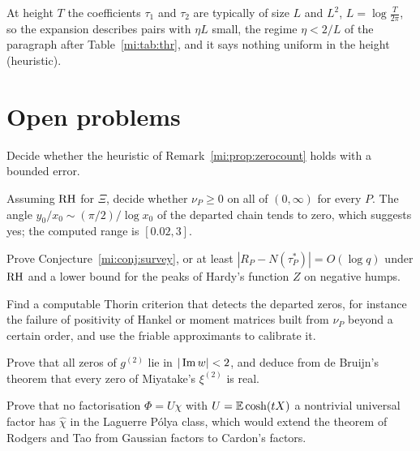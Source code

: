 At height $T$ the coefficients $\tau_1$ and $\tau_2$ are typically of size $L$ and $L^2$, $L=\log\frac T{2\pi}$, so the expansion describes pairs with $\eta L$ small, the regime $\eta<2/L$ of the paragraph after Table~\ref{mi:tab:thr}, and it says nothing uniform in the height (heuristic).

\section{Open problems}\label{mi:sec:open}

\begin{problem}
Decide whether the heuristic of Remark~\ref{mi:prop:zerocount} holds with a bounded error.
\end{problem}

\begin{problem}\label{mi:prob:nuP}
Assuming $\mathrm{RH}$ for $\Xi$, decide whether $\nu_P\ge0$ on all of $(0,\infty)$ for every $P$. The angle $y_0/x_0\sim(\pi/2)/\log x_0$ of the departed chain tends to zero, which suggests yes; the computed range is $[0.02,3]$.
\end{problem}

\begin{problem}
Prove Conjecture~\ref{mi:conj:survey}, or at least $|R_P-N(\tau_P^*)|=O(\log q)$ under $\mathrm{RH}$ and a lower bound for the peaks of Hardy's function $Z$ on negative humps.
\end{problem}

\begin{problem}
Find a computable Thorin criterion that detects the departed zeros, for instance the failure of positivity of Hankel or moment matrices built from $\nu_P$ beyond a certain order, and use the friable approximants to calibrate it.
\end{problem}

\begin{problem}
Prove that all zeros of $g^{(2)}$ lie in $|\operatorname{Im} w|<2$, and deduce from de Bruijn's theorem that every zero of Miyatake's $\xi^{(2)}$ is real.
\end{problem}

\begin{problem}\label{mi:prob:cardon}
Prove that no factorisation $\Phi=U\chi$ with $U=\mathbb{E}\cosh(tX)$ a nontrivial universal factor has $\hat\chi$ in the Laguerre P\'olya class, which would extend the theorem of Rodgers and Tao from Gaussian factors to Cardon's factors.
\end{problem}

